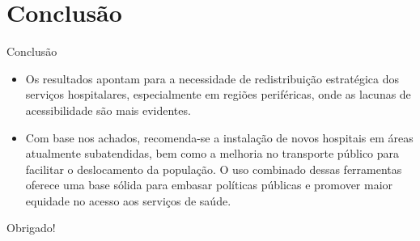 \documentclass{beamer}
\begin{document}
\section{Conclusão}
\begin{frame}{Conclusão}
    \begin{itemize}
        \item Os resultados apontam para a necessidade de redistribuição estratégica dos serviços hospitalares, especialmente em regiões periféricas, onde as lacunas de acessibilidade são mais evidentes.
        \item Com base nos achados, recomenda-se a instalação de novos hospitais em áreas atualmente subatendidas, bem como a melhoria no transporte público para facilitar o deslocamento da população. O uso combinado dessas ferramentas oferece uma base sólida para embasar políticas públicas e promover maior equidade no acesso aos serviços de saúde.
    \end{itemize}
\end{frame}

\begin{frame}
    \centering
    \Huge Obrigado!
\end{frame}
\end{document}
